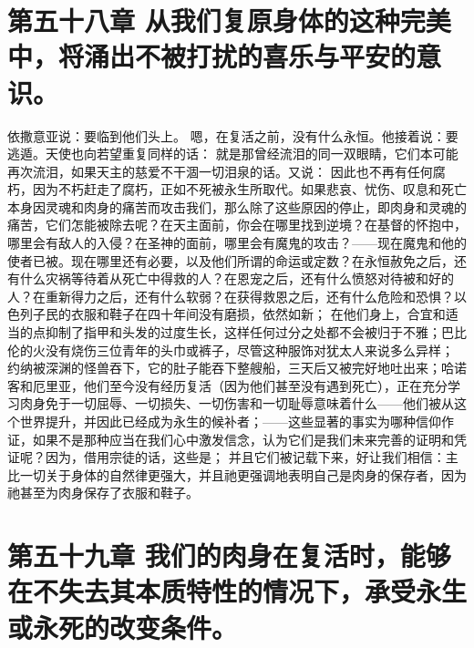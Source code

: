 
\section{第五十八章 从我们复原身体的这种完美中，将涌出不被打扰的喜乐与平安的意识。}

依撒意亚说：要临到他们头上。 嗯，在复活之前，没有什么永恒。他接着说：要逃遁。天使也向若望重复同样的话： 就是那曾经流泪的同一双眼睛，它们本可能再次流泪，如果天主的慈爱不干涸一切泪泉的话。又说： 因此也不再有任何腐朽，因为不朽赶走了腐朽，正如不死被永生所取代。如果悲哀、忧伤、叹息和死亡本身因灵魂和肉身的痛苦而攻击我们，那么除了这些原因的停止，即肉身和灵魂的痛苦，它们怎能被除去呢？在天主面前，你会在哪里找到逆境？在基督的怀抱中，哪里会有敌人的入侵？在圣神的面前，哪里会有魔鬼的攻击？——现在魔鬼和他的使者已被。现在哪里还有必要，以及他们所谓的命运或定数？在永恒赦免之后，还有什么灾祸等待着从死亡中得救的人？在恩宠之后，还有什么愤怒对待被和好的人？在重新得力之后，还有什么软弱？在获得救恩之后，还有什么危险和恐惧？以色列子民的衣服和鞋子在四十年间没有磨损，依然如新； 在他们身上，合宜和适当的点抑制了指甲和头发的过度生长，这样任何过分之处都不会被归于不雅；巴比伦的火没有烧伤三位青年的头巾或裤子，尽管这种服饰对犹太人来说多么异样； 约纳被深渊的怪兽吞下，它的肚子能吞下整艘船，三天后又被完好地吐出来；哈诺客和厄里亚，他们至今没有经历复活（因为他们甚至没有遇到死亡），正在充分学习肉身免于一切屈辱、一切损失、一切伤害和一切耻辱意味着什么——他们被从这个世界提升，并因此已经成为永生的候补者；——这些显著的事实为哪种信仰作证，如果不是那种应当在我们心中激发信念，认为它们是我们未来完善的证明和凭证呢？因为，借用宗徒的话，这些是； 并且它们被记载下来，好让我们相信：主比一切关于身体的自然律更强大，并且祂更强调地表明自己是肉身的保存者，因为祂甚至为肉身保存了衣服和鞋子。\par


\section{第五十九章 我们的肉身在复活时，能够在不失去其本质特性的情况下，承受永生或永死的改变条件。}

